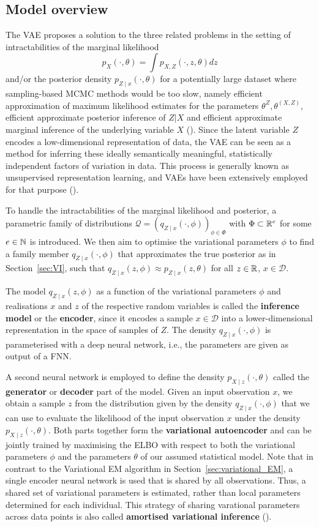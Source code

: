 \subsection{Model overview}\label{sec:VAE_model_overview}
The VAE proposes a solution to the three related problems in the setting of intractabilities of the marginal likelihood 
$$p_X(\cdot,\theta) = \int p_{X,Z}(\cdot,z,\theta)dz$$ 
and/or the posterior density
$p_{Z\mid x}(\cdot,\theta)$
for a potentially large dataset where sampling-based MCMC methods would be too slow, namely efficient approximation of maximum likelihood estimates for the parameters $\theta^Z, \theta^{(X,Z)}$, efficient approximate posterior inference of $Z\vert X$ and efficient approximate marginal inference of the underlying variable $X$ (\cite[pp.~2f.]{Kingma2013}). 
Since the latent variable $Z$ encodes a low-dimensional representation of data, the VAE can be seen as a method for inferring these ideally semantically meaningful, statistically independent factors of variation in data. This process is generally known as unsupervised representation learning, and VAEs have been extensively employed for that purpose (\cite[p.~4]{Kingma2019}).

To handle the intractabilities of the marginal likelihood and posterior, a parametric family of distributions $\mathcal{Q}= (q_{Z\mid x}(\cdot, \phi))_{\phi\in\Phi}$ with $\Phi\subset \mathbb{R}^e$ for some $e\in \mathbb{N}$ is introduced. We then aim to optimise the variational parameters $\phi$ to find a family member $q_{Z\mid x}(\cdot, \phi)$ that approximates the true posterior as in Section~\ref{sec:VI}, such that $q_{Z\mid x}(z, \phi) \approx p_{Z\mid x}(z,\theta)$ for all $z\in \mathbb{R}$, $x\in \mathcal{D}$.

The model $q_{Z\mid x}(z, \phi)$ as a function of the variational parameters $\phi$ and realisations $x$ and $z$ of the respective random variables is called the \textbf{inference model} or the \textbf{encoder}, since it encodes a sample $x \in \mathcal{D}$ into a lower-dimensional representation in the space of samples of $Z$. The density $q_{Z\mid x}(\cdot, \phi)$ is parameterised with a deep neural network, i.e., the parameters are given as output of a FNN. 

A second neural network is employed to define the density $p_{X\mid z}(\cdot,\theta)$ called the \textbf{generator} or \textbf{decoder} part of the model. Given an input observation $x$, we obtain a sample $z$ from the distribution given by the density $q_{Z\mid x}(\cdot, \phi)$ that we can use to evaluate the likelihood of the input observation $x$ under the density $p_{X\mid z}(\cdot,\theta)$. Both parts together form the \textbf{variational autoencoder} and can be jointly trained by maximising the ELBO with respect to both the variational parameters $\phi$ and the parameters $\theta$ of our assumed statistical model. 
Note that in contrast to the Variational EM algorithm in Section~\ref{sec:variational_EM}, a single encoder neural network is used that is shared by all observations. Thus, a shared set of variational parameters is estimated, rather than local parameters determined for each individual. This strategy of sharing varational parameters across data points is also called \textbf{amortised variational inference} (\cite[p.~16]{Kingma2019}).

